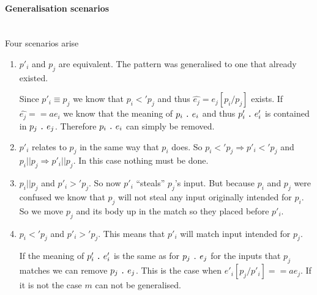 \paragraph{Generalisation scenarios} \ \\
Four scenarios arise
\begin{enumerate}
\item $p'_i$ and $p_j$ are equivalent. The pattern was generalised to one that
  already existed.

  Since $p'_i \equiv p_j$ we know that $p_i <' p_j$ and thus $\hat{e_j} =
  e_j[p_i/p_j]$ exists. If $\hat{e_j} ==a e_i$ we know that the meaning of
  $p_i\mathrel{\texttt{.}}e_i$ and thus $p'_i\mathrel{\texttt{.}}e'_i$ is contained in
  $p_j\mathrel{\texttt{.}}e_j$. Therefore $p_i\mathrel{\texttt{.}}e_i$ can simply be
  removed.\label{item:gen-scen-1}
\item $p'_i$ relates to $p_j$ in the same way that $p_i$ does. So $p_i <' p_j
  \Rightarrow p'_i <' p_j$ and $p_i || p_j \Rightarrow p'_i || p_j$. In this
  case nothing must be done. \label{item:gen-scen-2}
\item $p_i || p_j$ and $p'_i >' p_j$. So now $p'_i$ ``steals'' $p_j$'s input. But
  because $p_i$ and $p_j$ were confused we know that $p_j$ will not steal any
  input originally intended for $p_i$. So we move $p_j$ and its body up in the
  match so they placed before $p'_i$. \label{item:gen-scen-3}
\item $p_i <' p_j$ and $p'_i >' p_j$. This means that $p'_i$ will match input
  intended for $p_j$.

  If the meaning of $p'_i\mathrel{\texttt{.}}e'_i$ is the same as for $p_j\mathrel{\texttt{.}}e_j$
  for the inputs that $p_j$ matches we can remove $p_j\mathrel{\texttt{.}}e_j$. This is
  the case when $e'_i[p_j/p'_i] ==a e_j$. If it is not the case $m$ can not be
  generalised. \label{item:gen-scen-4}
\end{enumerate}

